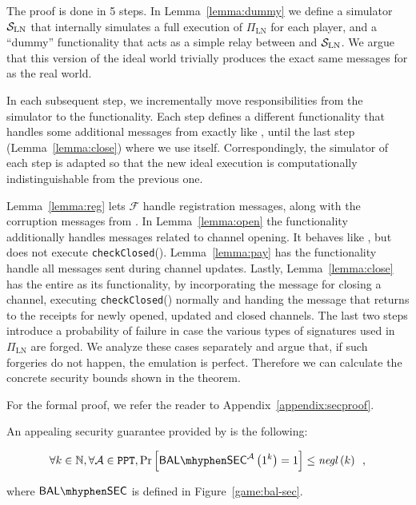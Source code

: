   \begin{proofsketch}
    The proof is done in 5 steps. In Lemma~\ref{lemma:dummy} we define a
    simulator $\mathcal{S}_{\mathrm{LN}}$ that internally simulates a full
    execution of $\Pi_{\mathrm{LN}}$ for each player, and a ``dummy''
    functionality that acts as a simple relay between \environment{} and
    $\mathcal{S}_{\mathrm{LN}}$. We argue that this version of the ideal world
    trivially produces the exact same messages for \environment{} as the real
    world.

    In each subsequent step, we incrementally move responsibilities from the
    simulator to the functionality. Each step defines a different functionality
    that handles some additional messages from \environment{} exactly like
    \fpaynet, until the last step (Lemma~\ref{lemma:close}) where we use
    \fpaynet{} itself. Correspondingly, the simulator of each step is adapted so
    that the new ideal execution is computationally indistinguishable from the
    previous one.

    Lemma~\ref{lemma:reg} lets $\mathcal{F}$ handle registration messages,
    along with the corruption messages from \simulator. In Lemma~\ref{lemma:open}
    the functionality additionally handles messages related to channel opening. It
    behaves like \fpaynet, but does not execute \texttt{checkClosed}().
    Lemma~\ref{lemma:pay} has the functionality handle all messages sent during
    channel updates. Lastly, Lemma~\ref{lemma:close} has the entire \fpaynet{} as
    its functionality, by incorporating the message for closing a channel,
    executing \texttt{checkClosed}() normally and handing the message that returns
    to \environment{} the receipts for newly opened, updated and closed
    channels. The last two steps introduce a probability of failure in case
    the various types of signatures used in  $\Pi_{\mathrm{LN}}$ are forged. We analyze these cases separately and argue that, if
    such forgeries do not happen, the emulation is perfect. Therefore we can
    calculate the concrete security bounds shown in the theorem.
  \end{proofsketch}
  For the formal proof, we refer the reader to Appendix~\ref{appendix:secproof}.

  An appealing security guarantee provided by \fpaynet{} is the following:
  \begin{corollary}
    \begin{equation*}
      \forall k \in \mathbb{N}, \forall \adversary{} \in \mathtt{PPT},
      \Pr\left[\mathsf{BAL \mhyphen SEC}^{\adversary}\left(1^k\right) = 1\right]
      \leq \mathit{negl}\left(k\right) \enspace,
    \end{equation*}
  \end{corollary}
  where $\mathsf{BAL \mhyphen SEC}$ is defined in Figure~\ref{game:bal-sec}.

